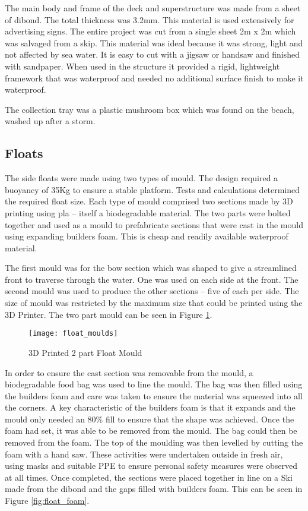 \documentclass [12pt]{article}
\begin{document}
The main body and frame of the deck and superstructure was made from a sheet of \gls{dibond}. The total thickness was 3.2mm. This material is used extensively for advertising signs. The entire project was cut from a single sheet 2m x 2m which was salvaged from a skip. This material was ideal because it was strong, light and not affected by sea water. It is easy to cut with a jigsaw or handsaw and finished with sandpaper. When used in the structure it provided a rigid, lightweight framework that was waterproof and needed no additional surface finish to make it waterproof.

The collection tray was a plastic mushroom box which was found on the beach, washed up after a storm.

\subsection{Floats}

The side floats were made using two types of mould. The design required a buoyancy of 35Kg to ensure a stable platform. Tests and calculations determined the required float size.
Each type of mould comprised two sections made by 3D printing using \gls{pla} – itself a biodegradable material. The two parts were bolted together and used as a mould to prefabricate sections that were cast in the mould using expanding builders foam. This is cheap and readily available waterproof material.

The first mould was for the bow section which was shaped to give a streamlined front to traverse through the water. One was used on each side at the front.  The second mould was used to produce the other sections – five of each per side. The size of mould was restricted by the maximum size that could be printed using the 3D Printer. The two part mould can be seen in Figure \ref{fig:float_moulds}.

\begin{figure}[H]
\centerline{\texttt{[image: float\_moulds]}}
\caption{3D Printed 2 part Float Mould}
\label{fig:float_moulds}
\end{figure}

In order to ensure the cast section was removable from the mould, a biodegradable food bag was used to line the mould. The bag was then filled using the builders foam and care was taken to ensure the material was squeezed into all the corners. A key characteristic of the builders foam is that it expands and the mould only needed an 80\% fill to ensure that the shape was achieved. Once the foam had set, it was able to be removed from the mould. The bag could then be removed from the foam. The top of the moulding was then levelled by cutting the foam with a hand saw.
These activities were undertaken outside in fresh air, using masks and suitable PPE to ensure personal safety measures were observed at all times.
Once completed, the sections were placed together in line on a Ski made from the \gls{dibond} and the gaps filled with builders foam. This can be seen in Figure \ref{fig:float_foam}.
\end{document}
